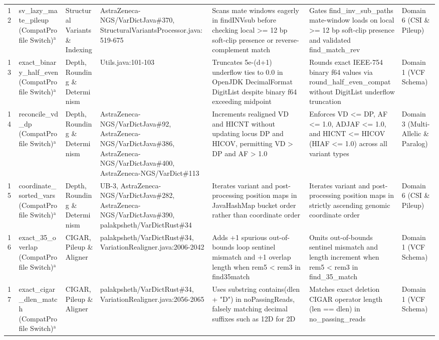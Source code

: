 \begin{table}[htbp]
{\begin{tabular}{lllllll}
12 & sv\_lazy\_mate\_pileup (CompatProfile Switch)$^{\text{a}}$ & Structural Variants \& Indexing & AstraZeneca-NGS/VarDictJava\#370, StructuralVariantsProcessor.java:519-675 & Scans mate windows eagerly in findINVsub before checking local \textgreater{}= 12 bp soft-clip presence or reverse-complement match & Gates find\_inv\_sub\_paths mate-window loads on local \textgreater{}= 12 bp soft-clip presence and validated find\_match\_rev & Domain 6 (CSI \& Pileup) \\
13 & exact\_binary\_half\_even (CompatProfile Switch)$^{\text{a}}$ & Depth, Rounding \& Determinism & Utils.java:101-103 & Truncates 5e-(d+1) underflow ties to 0.0 in OpenJDK DecimalFormat DigitList despite binary f64 exceeding midpoint & Rounds exact IEEE-754 binary f64 values via round\_half\_even\_compat without DigitList underflow truncation & Domain 1 (VCF Schema) \\
14 & reconcile\_vd\_dp (CompatProfile Switch)$^{\text{a}}$ & Depth, Rounding \& Determinism & AstraZeneca-NGS/VarDictJava\#92, AstraZeneca-NGS/VarDictJava\#386, AstraZeneca-NGS/VarDictJava\#400, AstraZeneca-NGS/VarDict\#113 & Increments realigned VD and HICNT without updating locus DP and HICOV, permitting VD \textgreater{} DP and AF \textgreater{} 1.0 & Enforces VD \textless{}= DP, AF \textless{}= 1.0, ADJAF \textless{}= 1.0, and HICNT \textless{}= HICOV (HIAF \textless{}= 1.0) across all variant types & Domain 3 (Multi-Allelic \& Paralog) \\
15 & coordinate\_sorted\_vars (CompatProfile Switch)$^{\text{a}}$ & Depth, Rounding \& Determinism & UB-3, AstraZeneca-NGS/VarDictJava\#282, AstraZeneca-NGS/VarDictJava\#390, palakpsheth/VarDictRust\#34 & Iterates variant and post-processing position maps in JavaHashMap bucket order rather than coordinate order & Iterates variant and post-processing position maps in strictly ascending genomic coordinate order & Domain 6 (CSI \& Pileup) \\
16 & exact\_35\_overlap (CompatProfile Switch)$^{\text{a}}$ & CIGAR, Pileup \& Aligner & palakpsheth/VarDictRust\#34, VariationRealigner.java:2006-2042 & Adds +1 spurious out-of-bounds loop sentinel mismatch and +1 overlap length when rem5 \textless{} rem3 in find35match & Omits out-of-bounds sentinel mismatch and length increment when rem5 \textless{} rem3 in find\_35\_match & Domain 1 (VCF Schema) \\
17 & exact\_cigar\_dlen\_match (CompatProfile Switch)$^{\text{a}}$ & CIGAR, Pileup \& Aligner & palakpsheth/VarDictRust\#34, VariationRealigner.java:2056-2065 & Uses substring contains(dlen + "D") in noPassingReads, falsely matching decimal suffixes such as 12D for 2D & Matches exact deletion CIGAR operator length (len == dlen) in no\_passing\_reads & Domain 1 (VCF Schema) \\

\end{tabular}}
\end{table}
